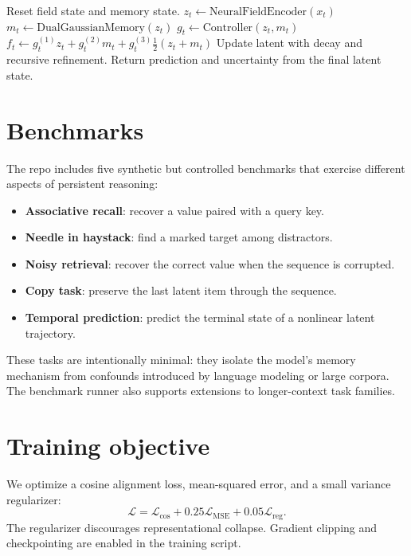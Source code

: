 \documentclass{article}
\begin{document}
\begin{algorithm}[H]
\caption{GMF forward pass (single sequence)}
\begin{algorithmic}[1]
\State Reset field state and memory state.
  \State $z_t \gets \mathrm{NeuralFieldEncoder}(x_t)$
  \State $m_t \gets \mathrm{DualGaussianMemory}(z_t)$
  \State $g_t \gets \mathrm{Controller}(z_t, m_t)$
  \State $f_t \gets g_t^{(1)} z_t + g_t^{(2)} m_t + g_t^{(3)} \tfrac{1}{2}(z_t+m_t)$
  \State Update latent with decay and recursive refinement.
\EndFor
\State Return prediction and uncertainty from the final latent state.
\end{algorithmic}
\end{algorithm}

\section{Benchmarks}
The repo includes five synthetic but controlled benchmarks that exercise different aspects of persistent reasoning:
\begin{itemize}[leftmargin=*]
\item \textbf{Associative recall}: recover a value paired with a query key.
\item \textbf{Needle in haystack}: find a marked target among distractors.
\item \textbf{Noisy retrieval}: recover the correct value when the sequence is corrupted.
\item \textbf{Copy task}: preserve the last latent item through the sequence.
\item \textbf{Temporal prediction}: predict the terminal state of a nonlinear latent trajectory.
\end{itemize}

These tasks are intentionally minimal: they isolate the model's memory mechanism from confounds introduced by language modeling or large corpora. The benchmark runner also supports extensions to longer-context task families.

\section{Training objective}
We optimize a cosine alignment loss, mean-squared error, and a small variance regularizer:
\[
\mathcal{L} = \mathcal{L}_{\cos} + 0.25\mathcal{L}_{\mathrm{MSE}} + 0.05\mathcal{L}_{\mathrm{reg}}.
\]
The regularizer discourages representational collapse. Gradient clipping and checkpointing are enabled in the training script.
\end{document}
